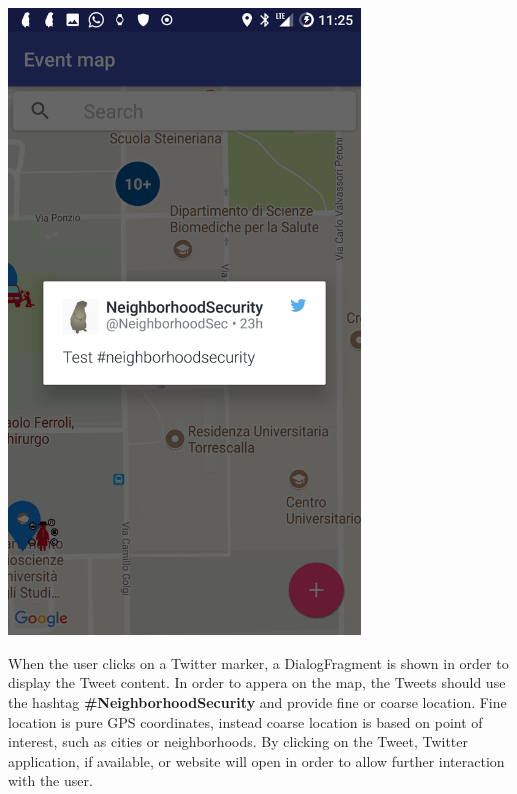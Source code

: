 \documentclass[a4paper]{scrreprt}
\begin{document}
\begin{minipage}{0.5\textwidth}
	\centering
	\includegraphics[width=0.7\textwidth]{twitter}
\end{minipage}
\begin{minipage}{0.5\textwidth}
	When the user clicks on a Twitter marker, a DialogFragment is shown in order to display the Tweet content. In order to appera on the map, the Tweets should use the hashtag \textbf{\#NeighborhoodSecurity} and provide fine or coarse location. Fine location is pure GPS coordinates, instead coarse location is based on point of interest, such as cities or neighborhoods. By clicking on the Tweet, Twitter application, if available, or website will open in order to allow further interaction with the user.
\end{minipage}
\end{document}
